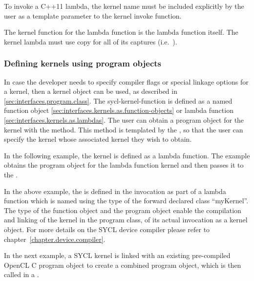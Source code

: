 To invoke a C++11 lambda, the kernel name must be included explicitly by the
user as a template parameter to the kernel invoke function.

The kernel function for the lambda function is the lambda function itself.
The kernel lambda must use copy for all of its captures (i.e.\ \tf{[=]}).



\subsubsection{Defining kernels using program objects}

In case the developer needs to specify compiler flags or special linkage options
for a kernel, then a kernel object can be used, as described in
\ref{sec:interfaces.program.class}. The \gls{sycl-kernel-function} is defined
as a named function object
\ref{sec:interfaces.kernels.as.function-objects} or lambda function
\ref{sec:interfaces.kernels.as.lambdas}. The user can obtain a program
object for the kernel with the  method. This
method is templated by the , so that the user
can specify the kernel whose associated kernel they wish to obtain.

In the following example, the kernel is defined as a lambda function.
The example obtains the program object for the lambda function kernel
and then passes it to the .



In the above example, the  is defined in the
 invocation as part of a lambda function which is named
using the type of the forward declared class ``myKernel''. The type of the
function object and the program object enable the compilation and linking of the kernel
in the program class,  of its actual invocation as a kernel
object. For more details on the SYCL device compiler please refer to
chapter~\ref{chapter.device.compiler}.

In the next example, a SYCL kernel is linked with an existing pre-compiled
OpenCL C program object to create a combined program object, which is then
called in a .

